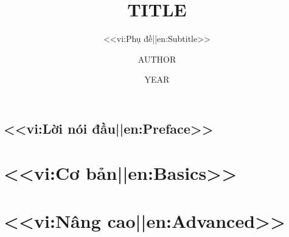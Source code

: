 \documentclass[12pt,a4paper,oneside,openany]{book}
\title{{{TITLE}}}
\subtitle{<<vi:Phụ đề||en:Subtitle>>}
\author{{{AUTHOR}}}
\date{{{YEAR}}}
\begin{document}
\frontmatter
\lktitlepage
\chapter{<<vi:Lời nói đầu||en:Preface>>}
\tableofcontents
\listoffigures

\mainmatter
\part{<<vi:Cơ bản||en:Basics>>}


\part{<<vi:Nâng cao||en:Advanced>>}


\backmatter
\lkbibliography
\printindex
\end{document}
